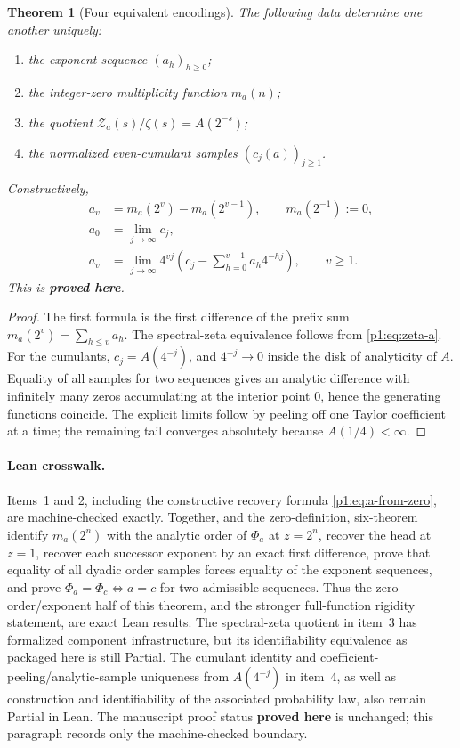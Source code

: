 \documentclass[11pt,oneside]{article}
\numberwithin{equation}{section}
\newtheorem{theorem}{Theorem}[section]
\theoremstyle{definition}
\theoremstyle{remark}
\newcommand{\statusproved}{\textcolor{deepgreen}{\textbf{proved here}}}
\newcommand{\Zspec}{\mathcal Z}
\begin{document}
\begin{theorem}[Four equivalent encodings]
\label{p1:thm:identifiability}
The following data determine one another uniquely:
\begin{enumerate}
\item the exponent sequence $(a_h)_{h\ge0}$;
\item the integer-zero multiplicity function $m_a(n)$;
\item the quotient $\Zspec_a(s)/\zeta(s)=A(2^{-s})$;
\item the normalized even-cumulant samples $(c_j(a))_{j\ge1}$.
\end{enumerate}
Constructively,
\begin{align}
 a_v&=m_a(2^v)-m_a(2^{v-1}),
 \qquad m_a(2^{-1}):=0,
 \label{p1:eq:a-from-zero}\\
 a_0&=\lim_{j\to\infty}c_j,
 \label{p1:eq:a0-limit}\\
 a_v&=\lim_{j\to\infty}4^{vj}
 \left(c_j-\sum_{h=0}^{v-1}a_h4^{-hj}\right),
 \qquad v\ge1.
 \label{p1:eq:av-limit}
\end{align}
This is \statusproved.
\end{theorem}

\begin{proof}
The first formula is the first difference of the prefix sum
$m_a(2^v)=\sum_{h\le v}a_h$.  The spectral-zeta equivalence follows from
\eqref{p1:eq:zeta-a}.  For the cumulants, $c_j=A(4^{-j})$, and
$4^{-j}\to0$ inside the disk of analyticity of $A$.  Equality of all samples for two
sequences gives an analytic difference with infinitely many zeros accumulating at the
interior point $0$, hence the generating functions coincide.  The explicit limits follow
by peeling off one Taylor coefficient at a time; the remaining tail converges absolutely
because $A(1/4)<\infty$.
\end{proof}

\paragraph{Lean crosswalk.}
Items~1 and 2, including the constructive recovery formula
\eqref{p1:eq:a-from-zero}, are machine-checked exactly.  Together,
 and the zero-definition, six-theorem
 identify $m_a(2^n)$ with the analytic order
of $\Phi_a$ at $z=2^n$, recover the head at $z=1$, recover each successor exponent by an
exact first difference, prove that equality of all dyadic order samples forces equality of
the exponent sequences, and prove
$\Phi_a=\Phi_c\Longleftrightarrow a=c$ for two admissible sequences.  Thus the
zero-order/exponent half of this theorem, and the stronger full-function rigidity statement,
are exact Lean results.  The spectral-zeta quotient in item~3 has formalized component
infrastructure, but its identifiability equivalence as packaged here is still Partial.  The
cumulant identity and coefficient-peeling/analytic-sample uniqueness from
$A(4^{-j})$ in item~4, as well as construction and identifiability of the associated
probability law, also remain Partial in Lean.  The manuscript proof status
\statusproved{} is unchanged; this paragraph records only the machine-checked boundary.
\end{document}

